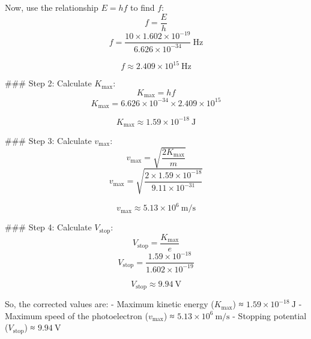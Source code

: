 \documentclass[addpoints]{exam}
\begin{document}
\begin{questions}
\begin{parts}
\begin{solution}
Now, use the relationship \( E = hf \) to find \( f \):
\[ f = \frac{E}{h} \]
\[ f = \frac{10 \times 1.602 \times 10^{-19}}{6.626 \times 10^{-34}} \ \text{Hz} \]

\[ f \approx 2.409 \times 10^{15} \ \text{Hz} \]

### Step 2: Calculate \( K_{\text{max}} \):
\[ K_{\text{max}} = hf \]
\[ K_{\text{max}} = 6.626 \times 10^{-34} \times 2.409 \times 10^{15} \]

\[ K_{\text{max}} \approx 1.59 \times 10^{-18} \ \text{J} \]

### Step 3: Calculate \( v_{\text{max}} \):
\[ v_{\text{max}} = \sqrt{\frac{2 K_{\text{max}}}{m}} \]
\[ v_{\text{max}} = \sqrt{\frac{2 \times 1.59 \times 10^{-18}}{9.11 \times 10^{-31}}} \]

\[ v_{\text{max}} \approx 5.13 \times 10^6 \ \text{m/s} \]

### Step 4: Calculate \( V_{\text{stop}} \):
\[ V_{\text{stop}} = \frac{K_{\text{max}}}{e} \]
\[ V_{\text{stop}} = \frac{1.59 \times 10^{-18}}{1.602 \times 10^{-19}} \]

\[ V_{\text{stop}} \approx 9.94 \ \text{V} \]

So, the corrected values are:
- Maximum kinetic energy (\(K_{\text{max}}\)) ≈ \(1.59 \times 10^{-18} \ \text{J}\)
- Maximum speed of the photoelectron (\(v_{\text{max}}\)) ≈ \(5.13 \times 10^6 \ \text{m/s}\)
- Stopping potential (\(V_{\text{stop}}\)) ≈ \(9.94 \ \text{V}\)
    \end{solution}
\end{parts}

\end{questions}
\end{document}
